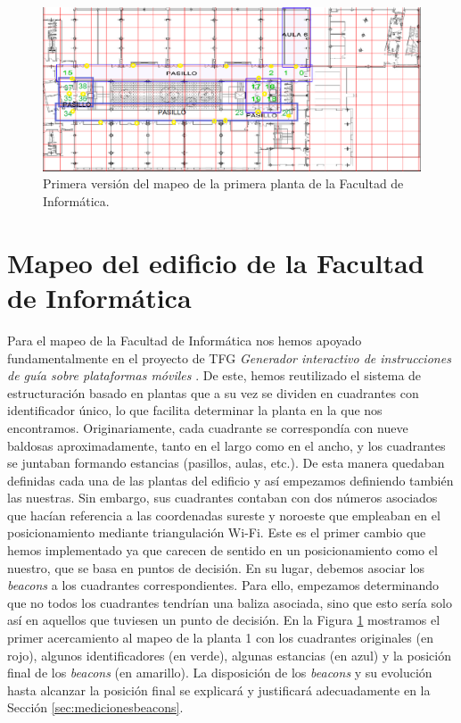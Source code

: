 \begin{figure}[t]
	\centering
	\includegraphics[width=1\textwidth]{Imagenes/Descripciondeltrabajo/mapaplanta1_cuadrantes}
	\caption{Primera versión del mapeo de la primera planta de la Facultad de Informática.}
	\label{fig:cuadrantesP1_v1}
\end{figure}



\section{Mapeo del edificio de la Facultad de Informática}
\label{sec:mapeo}

Para el mapeo de la Facultad de Informática nos hemos apoyado fundamentalmente en el proyecto de TFG \textit{Generador interactivo de instrucciones de guía sobre plataformas móviles} \citep{TFGguia}. De este, hemos reutilizado el sistema de estructuración basado en plantas que a su vez se dividen en cuadrantes con identificador único, lo que facilita determinar la planta en la que nos encontramos.
Originariamente, cada cuadrante se correspondía con nueve baldosas aproximadamente, tanto en el largo como en el ancho, y los cuadrantes se juntaban formando estancias (pasillos, aulas, etc.). De esta manera quedaban definidas cada una de las plantas del edificio y así empezamos definiendo también las nuestras. Sin embargo, sus cuadrantes contaban con dos números asociados que hacían referencia a las coordenadas sureste y noroeste que empleaban en el posicionamiento mediante triangulación Wi-Fi. Este es el primer cambio que hemos implementado ya que carecen de sentido en un posicionamiento como el nuestro, que se basa en puntos de decisión. En su lugar, debemos asociar los \textit{beacons} a los cuadrantes correspondientes. Para ello, empezamos determinando que no todos los cuadrantes tendrían una baliza asociada, sino que esto sería solo así en aquellos que tuviesen un punto de decisión. En la Figura \ref{fig:cuadrantesP1_v1} mostramos el primer acercamiento al mapeo de la planta 1 con los cuadrantes originales (en rojo), algunos identificadores (en verde), algunas estancias (en azul) y la posición final de los \textit{beacons} (en amarillo). La disposición de los \textit{beacons} y su evolución hasta alcanzar la posición final se explicará y justificará adecuadamente en la Sección \ref{sec:medicionesbeacons}.


